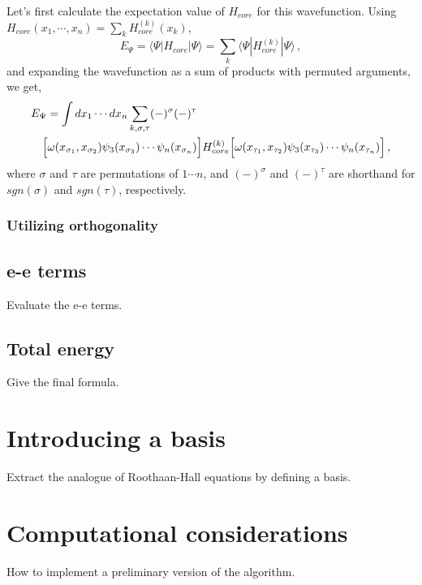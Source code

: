 \documentclass[11pt]{article}
\begin{document}
Let's first calculate the expectation value of $H_{core}$ for this
wavefunction. Using $H_{core}(x_1,\cdots, x_n)=\sum_k
H_{core}^{(k)}(x_k)$,
\begin{equation}
  E_\Psi = \langle\Psi|H_{core}|\Psi\rangle = \sum_k
  \langle\Psi|H_{core}^{(k)}|\Psi\rangle\,,
\end{equation}
and expanding the wavefunction as a sum of
products with permuted arguments, we get,
\begin{eqnarray*}
 \lefteqn{E_\Psi=\int dx_1\cdots dx_n
  \sum_{k,\sigma,\tau}(-)^\sigma (-)^\tau}\\& & 
 \Big[\omega(x_{\sigma_1},x_{\sigma_2})
  \psi_3(x_{\sigma_3})\cdots\psi_n(x_{\sigma_n})\Big]H_{core}^{(k)}\Big[\omega(x_{\tau_1},x_{\tau_2})
  \psi_3(x_{\tau_3})\cdots\psi_n(x_{\tau_n})\Big]\,,
\end{eqnarray*}
where $\sigma$ and $\tau$ are permutations of $1\cdots n$, and
$(-)^\sigma$ and $(-)^\tau$ are shorthand for $sgn(\sigma)$ and
$sgn(\tau)$, respectively.

\subsubsection{Utilizing orthogonality}

\subsection{e-e terms}

Evaluate the e-e terms. 

\subsection{Total energy}

Give the final formula.

\section{Introducing a basis}

Extract the analogue of Roothaan-Hall equations by defining a basis. 

\section{Computational considerations}

How to implement a preliminary version of the algorithm.
\end{document}
